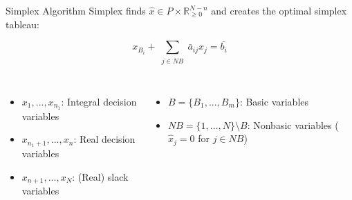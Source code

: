 \begin{frame}{Simplex Algorithm}
Simplex finds $\hat{x} \in P \times \mathbb{R}_{\geq 0}^{N-n}$ and creates the optimal simplex tableau:
\begin{center}
\begin{minipage}{0.8\textwidth}
	\begin{tcolorbox}[colback=white, title={$i-$th row in the simplex tableau}]
    \begin{equation*}
    	x_{B_i} + \sum\limits_{\substack{j \in NB}} \bar{a}_{ij} x_j = \bar{b_i}
    \end{equation*}
    \end{tcolorbox}
\end{minipage}
\end{center}
\begin{columns}
\begin{itemize}
\item $x_1,...,x_{n_1}$: Integral decision variables
\item $x_{n_1+1},...,x_n$: Real decision variables
\item $x_{n+1},...,x_N$: (Real) slack variables
\end{itemize}

\begin{itemize}
\item $B=\{B_1,...,B_m\}$: Basic variables
\item $NB = \{1,...,N\} \setminus B$: Nonbasic variables ($\hat{x}_j=0$ for $j \in NB$)
\end{itemize}
\end{columns}
\end{frame}

